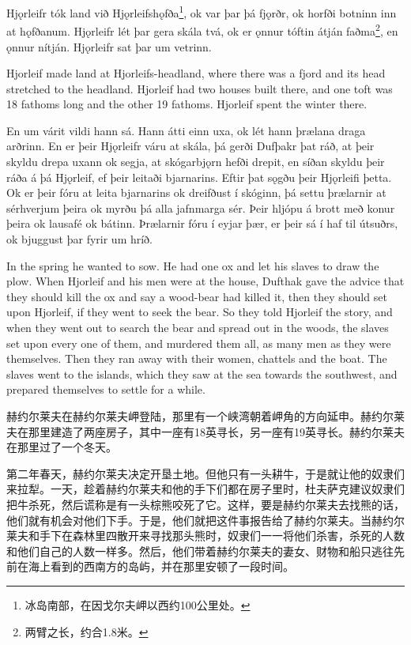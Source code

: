 \begin{paracol}{2}
    Hjǫrleifr tók land við Hjǫrleifshǫfða\footnote{冰岛南部，在因戈尔夫岬以西约100公里处。}, ok var þar þá fjǫrðr, ok horfði botninn inn at hǫfðanum. Hjǫrleifr lét þar gera skála tvá, ok er ǫnnur tóftin átján faðma\footnote{两臂之长，约合1.8米。}, en ǫnnur nítján. Hjǫrleifr sat þar um vetrinn.

    \switchcolumn

    Hjorleif made land at Hjorleifs-headland, where there was a fjord and its head stretched to the headland. Hjorleif had two houses built there, and one toft was 18 fathoms long and the other 19 fathoms. Hjorleif spent the winter there.

    \switchcolumn*

    En um várit vildi hann sá. Hann átti einn uxa, ok lét hann þrælana draga arðrinn. En er þeir Hjǫrleifr váru at skála, þá gerði Dufþakr þat ráð, at þeir skyldu drepa uxann ok segja, at skógarbjǫrn hefði drepit, en síðan skyldu þeir ráða á þá Hjǫrleif, ef þeir leitaði bjarnarins. Eftir þat sǫgðu þeir Hjǫrleifi þetta. Ok er þeir fóru at leita bjarnarins ok dreifðust í skóginn, þá settu þrælarnir at sérhverjum þeira ok myrðu þá alla jafnmarga sér. Þeir hljópu á brott með konur þeira ok lausafé ok bátinn. Þrælarnir fóru í eyjar þær, er þeir sá í haf til útsuðrs, ok bjuggust þar fyrir um hríð.

    \switchcolumn

    In the spring he wanted to sow. He had one ox and let his slaves to draw the plow. When Hjorleif and his men were at the house, Dufthak gave the advice that they should kill the ox and say a wood-bear had killed it, then they should set upon Hjorleif, if they went to seek the bear. So they told Hjorleif the story, and when they went out to search the bear and spread out in the woods, the slaves set upon every one of them, and murdered them all, as many men as they were themselves. Then they ran away with their women, chattels and the boat. The slaves went to the islands, which they saw at the sea towards the southwest, and prepared themselves to settle for a while.
\end{paracol}
\begin{translation*}{}
    赫约尔莱夫在赫约尔莱夫岬登陆，那里有一个峡湾朝着岬角的方向延申。赫约尔莱夫在那里建造了两座房子，其中一座有18英寻长，另一座有19英寻长。赫约尔莱夫在那里过了一个冬天。

    第二年春天，赫约尔莱夫决定开垦土地。但他只有一头耕牛，于是就让他的奴隶们来拉犁。一天，趁着赫约尔莱夫和他的手下们都在房子里时，杜夫萨克建议奴隶们把牛杀死，然后谎称是有一头棕熊咬死了它。这样，要是赫约尔莱夫去找熊的话，他们就有机会对他们下手。于是，他们就把这件事报告给了赫约尔莱夫。当赫约尔莱夫和手下在森林里四散开来寻找那头熊时，奴隶们一一将他们杀害，杀死的人数和他们自己的人数一样多。然后，他们带着赫约尔莱夫的妻女、财物和船只逃往先前在海上看到的西南方的岛屿，并在那里安顿了一段时间。
\end{translation*}

